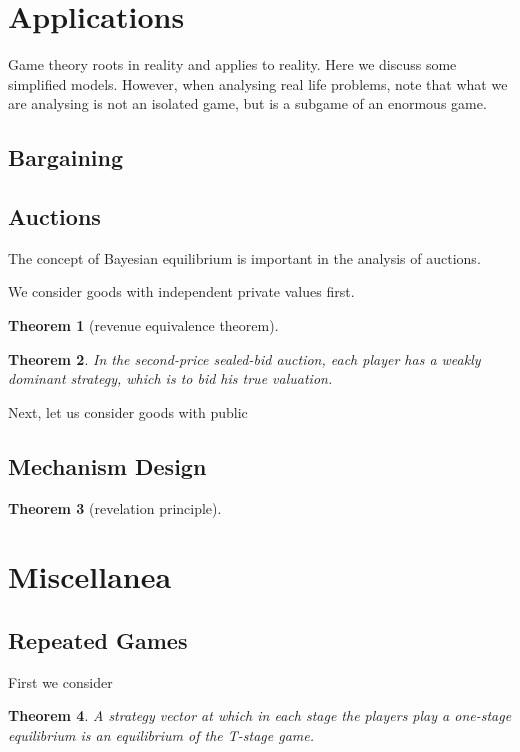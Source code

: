 \documentclass{article}
\newtheorem{Thm}{Theorem}[section]
\theoremstyle{definition}
\begin{document}
\section{Applications}
Game theory roots in reality and applies to reality. Here we discuss some simplified models. However,
when analysing real life problems, note that what we are analysing is not an isolated game, but is a subgame of an enormous game.
\subsection{Bargaining}




\subsection{Auctions}
The concept of Bayesian equilibrium is important in the analysis of auctions.\par 
We consider goods with independent private values first.

\begin{Thm}[revenue equivalence theorem]
    
\end{Thm}



\begin{Thm}
    In the second-price sealed-bid auction, each player has a weakly dominant strategy, which is to bid his true valuation.
\end{Thm}


Next, let us consider goods with public 

\subsection{Mechanism Design}
\begin{Thm}[revelation principle]
    
\end{Thm}



\section{Miscellanea}
\subsection{Repeated Games}
First we consider 
\begin{Thm}
    A strategy vector at which in each stage the players
    play a one-stage equilibrium is an equilibrium of the T-stage game.
\end{Thm}
\end{document}
